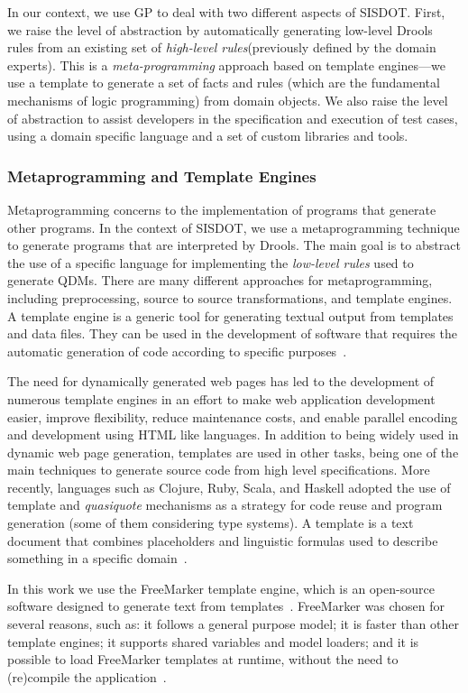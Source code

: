 \documentclass[twocolumn]{bmcart}%
\newcommand{\callers}{\emph{high-level rules}\xspace}
\begin{document}
In our context, we use GP to deal with two different aspects of SISDOT. First, we raise the level of abstraction by automatically generating low-level Drools rules from an existing set of \callers (previously defined by the domain experts). This is a \emph{meta-programming} approach based on template engines---we use a template to generate a set of facts and rules (which are the fundamental mechanisms of logic programming) from domain objects. We also raise the level of abstraction to assist developers in the specification and execution of test cases, using a domain specific language and a set of custom libraries and tools.  


\subsubsection{Metaprogramming and Template Engines}

Metaprogramming concerns to the implementation of programs that generate other programs. In the context of SISDOT, we use a metaprogramming technique to generate programs that are interpreted by Drools. The main goal is to abstract the use of a specific language for implementing the \emph{low-level rules} used to generate QDMs. There are many different approaches for metaprogramming, including preprocessing, source to source transformations, and template engines. A template engine is a generic tool for generating textual output from templates and data files. They can be used in the development of software that requires the automatic generation of code according to specific purposes~\cite{benato2017}. 

The need for dynamically generated web pages has led to the development of numerous template engines in an effort to make web application development easier, improve flexibility, reduce maintenance costs, and enable parallel encoding and development using HTML like languages. In addition to being widely used in dynamic web page generation, templates are used in other tasks, being one of the main techniques to generate source code from high level specifications. More recently, languages such as Clojure, Ruby, Scala, and Haskell adopted the use of template and \emph{quasiquote} mechanisms as a strategy for code reuse and program generation (some of them considering type systems). A template is a text document that combines placeholders and linguistic formulas used to describe something in a specific domain~\cite{segura2017}. 

In this work we use the FreeMarker template engine, which is an open-source software designed to generate text from templates~\cite{radjenovic2009}. FreeMarker was chosen for several reasons, such as: it follows a general purpose model; it is faster than other template engines; it supports shared variables and model loaders; and it is possible to load FreeMarker templates at runtime, without the need to (re)compile the application~\cite{benato2017,parr2006}.
\end{document}
